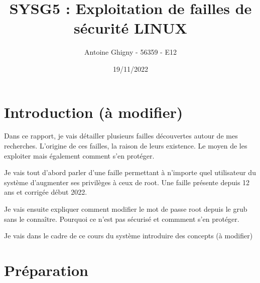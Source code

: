 \documentclass[a4paper, 12pt]{article}
\title{SYSG5 : Exploitation de failles de sécurité LINUX}
\author{Antoine Ghigny - 56359 - E12}          \let\Author\@author
\date{19/11/2022}           \let\Date\@date
\begin{document}
\maketitle 
   \newpage
   \tableofcontents

	\newpage
   \section{Introduction (à modifier)}
   \begin{flushleft}
       \noindent Dans ce rapport, je vais détailler plusieurs failles découvertes autour de mes recherches. L'origine de ces failles, la raison de leurs existence. Le moyen de les exploiter mais également comment s'en protéger.
       \item Je vais tout d'abord parler d'une faille permettant à n'importe quel utilisateur du système d'augmenter ses privilèges à ceux de root. Une faille présente depuis 12 ans et corrigée début 2022. 
       \item Je vais ensuite expliquer comment modifier le mot de passe root depuis le grub sans le connaître. Pourquoi ce n'est pas sécurisé et commment s'en protéger. 
       \item Je vais dans le cadre de ce cours du système introduire des concepts (à modifier)
   \end{flushleft}

   \section{Préparation}
\end{document}
